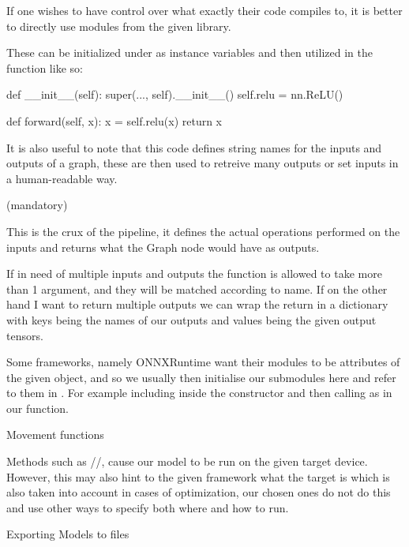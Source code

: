 If one wishes to have control over what
exactly their code compiles to,
it is better to directly use modules from the given library.

These can be initialized under 
as instance variables and then utilized in
the  function like so:

\begtt {}
def __init__(self):
  super(..., self).__init__()
  self.relu = nn.ReLU()

def forward(self, x):
  x = self.relu(x)
  return x
\endtt

It is also useful to note that this code defines
string names for the inputs and outputs of a graph,
these are then used to retreive many outputs or set inputs
in a human-readable way.

\secc {} (mandatory)

This is the crux of the pipeline,
it defines the actual operations performed on
the inputs and returns what the Graph node would have
as outputs.

If in need of multiple inputs and outputs
the function is allowed to take more than 1 argument,
and they will be matched according to name.
If on the other hand I want to return
multiple outputs we can wrap
the return in a dictionary with keys
being the names of our outputs and values being
the given output tensors.

\secc {}

Some frameworks, namely ONNXRuntime want their modules
to be attributes of the given object,
and so we usually then initialise our submodules here and refer to them in .
For example including  inside the constructor
and then calling as  in our  function.

\secc Movement functions

Methods such as //,
cause our model to be run on the given target device.
However, this may also hint to the given framework
what the target is which is also taken into account
in cases of optimization,
our chosen ones do not do this and use other ways to specify both
where and how to run.

\sec Exporting Models to files

